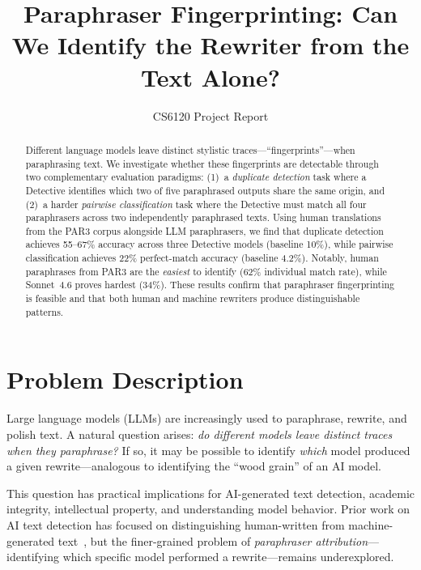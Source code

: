 \documentclass[sigconf,nonacm]{acmart}
\begin{document}
\title{Paraphraser Fingerprinting: Can We Identify the Rewriter from the Text Alone?}

\author{CS6120 Project Report}

\begin{abstract}
Different language models leave distinct stylistic traces---``fingerprints''---when paraphrasing text.
We investigate whether these fingerprints are detectable through two complementary evaluation paradigms: (1)~a \emph{duplicate detection} task where a Detective identifies which two of five paraphrased outputs share the same origin, and (2)~a harder \emph{pairwise classification} task where the Detective must match all four paraphrasers across two independently paraphrased texts.
Using human translations from the PAR3 corpus alongside LLM paraphrasers, we find that duplicate detection achieves 55--67\% accuracy across three Detective models (baseline 10\%), while pairwise classification achieves 22\% perfect-match accuracy (baseline 4.2\%).
Notably, human paraphrases from PAR3 are the \emph{easiest} to identify (62\% individual match rate), while Sonnet~4.6 proves hardest (34\%).
These results confirm that paraphraser fingerprinting is feasible and that both human and machine rewriters produce distinguishable patterns.
\end{abstract}

\maketitle

\section{Problem Description}

Large language models (LLMs) are increasingly used to paraphrase, rewrite, and polish text.
A natural question arises: \emph{do different models leave distinct traces when they paraphrase?}
If so, it may be possible to identify \emph{which} model produced a given rewrite---analogous to identifying the ``wood grain'' of an AI model.

This question has practical implications for AI-generated text detection, academic integrity, intellectual property, and understanding model behavior.
Prior work on AI text detection has focused on distinguishing human-written from machine-generated text~\cite{mitchell2023detectgpt}, but the finer-grained problem of \emph{paraphraser attribution}---identifying which specific model performed a rewrite---remains underexplored.
\end{document}
